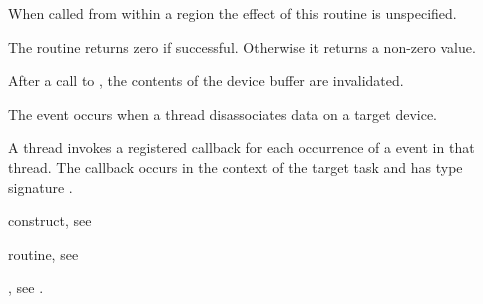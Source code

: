 When called from within a  region
the effect of this routine is unspecified.

The routine returns zero if successful. Otherwise it returns a non-zero value.

After a call to , the contents of the device
buffer are invalidated.

\events
The  event occurs when a thread 
disassociates data on a target device.

\tools
A thread invokes a registered 
callback for each occurrence of a  
event in that thread. The callback occurs in the context of the 
target task and has type signature .

\begin{crossrefs}
\item {} construct, see

\item {} routine, see

\item {}, see
.
\end{crossrefs}

